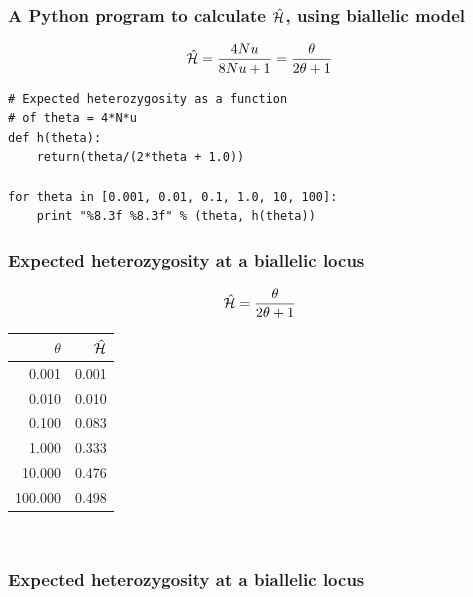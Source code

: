 \begin{frame}[containsverbatim]
\frametitle{A Python program to calculate $\hat{\mathcal{H}}$, using biallelic
model} 
\[
\hat{\mathcal{H}} = \frac{4Nu}{8Nu + 1} = \frac{\theta}{2\theta + 1}
\]

\bigskip

\begin{verbatim}
# Expected heterozygosity as a function
# of theta = 4*N*u
def h(theta):
    return(theta/(2*theta + 1.0))

for theta in [0.001, 0.01, 0.1, 1.0, 10, 100]:
    print "%8.3f %8.3f" % (theta, h(theta))
\end{verbatim}
\end{frame}

\begin{frame}
\frametitle{Expected heterozygosity at a biallelic locus}
\[
\hat{\mathcal{H}} = \frac{\theta}{2\theta + 1}
\]

\bigskip

{\centering\begin{tabular}{rr}
$\theta$& $\hat {\mathcal{H}}$\\
\hline
   0.001 &  0.001\\
   0.010 &  0.010\\
   0.100 &  0.083\\
   1.000 &  0.333\\
  10.000 &  0.476\\
 100.000 &  0.498
\end{tabular}\\}
\end{frame}

\begin{frame}
\frametitle{Expected heterozygosity at a biallelic locus}
\begin{center}

\end{center}
\end{frame}




